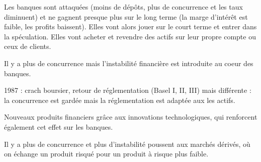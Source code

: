 	Les banques sont attaquées (moins de dépôts, plus de concurrence et les taux diminuent) et ne gagnent presque plus sur le long terme (la marge d'intérêt est faible, les profits baissent). Elles vont alors jouer sur le court terme et entrer dans la spéculation. Elles vont acheter et revendre des actifs sur leur propre compte ou ceux de clients.
	
	Il y a plus de concurrence mais l'instabilité financière est introduite au coeur des banques.
	
	1987 : crach boursier, retour de réglementation (Basel I, II, III) mais différente : la concurrence est gardée mais la réglementation est adaptée aux les actifs.
	
	Nouveaux produits financiers grâce aux innovations technologiques, qui renforcent également cet effet sur les banques.
	
	Il y a plus de concurrence et plus d'instabilité poussent aux marchés dérivés, où on échange un produit risqué pour un produit à risque plus faible.